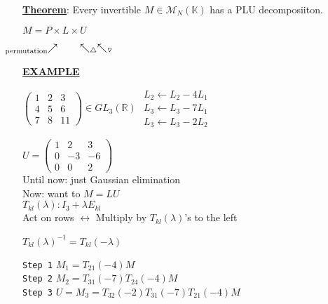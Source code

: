 \documentclass{article}
\begin{document}
\vspace{10pt}

\textbf{\underline{Theorem}}: Every invertible $M\in\mathcal{M}_N(\mathbb{K})$ has a PLU decomposiiton.

\centerline{$M=P\times L\times U$}
\centerline{$\hspace{-18pt}\prescript{}{\text{permutation}}{\nearrow}\quad\qquad\hspace{-10pt}\nwarrow_\triangle \nwarrow_\triangledown$}

\vspace{20pt}

\underline{\textbf{EXAMPLE}}

$\left(\begin{array}{ccc}
    1 & 2 & 3 \\
    4 & 5 & 6 \\
    7 & 8 & 11
\end{array}\right)\in GL_3(\mathbb{R})$
\hspace{10pt}$\begin{array}{c}L_2\leftarrow L_2 - 4 L_1 \\
L_3\leftarrow L_3 - 7 L_1 \\
L_3\leftarrow L_3 - 2 L_2
\end{array}$

$U=\left(\begin{array}{ccc}
    1 & 2 & 3 \\
    0 & -3 & -6 \\
    0 & 0 & 2
\end{array}\right)$ \\

\noindent Until now: just Gaussian elimination \\
Now: want to $M=LU$ \\

\noindent$T_{kl}(\lambda): I_3 + \lambda E_{kl}$ \\
Act on rows $\leftrightarrow$ Multiply by $T_{kl}(\lambda)$'s to the left

\centerline{\underline{$T_{kl}(\lambda)^{-1}=T_{kl}(-\lambda)$}}


\noindent\texttt{Step 1}\hspace{20pt} $M_1=T_{21}(-4)M$ \\
\texttt{Step 2}\hspace{20pt} $M_2=T_{31}(-7)T_{24}(-4)M$ \\
\texttt{Step 3}\hspace{20pt} $U=M_3=T_{32}(-2)T_{31}(-7)T_{21}(-4)M$ \\
\end{document}
